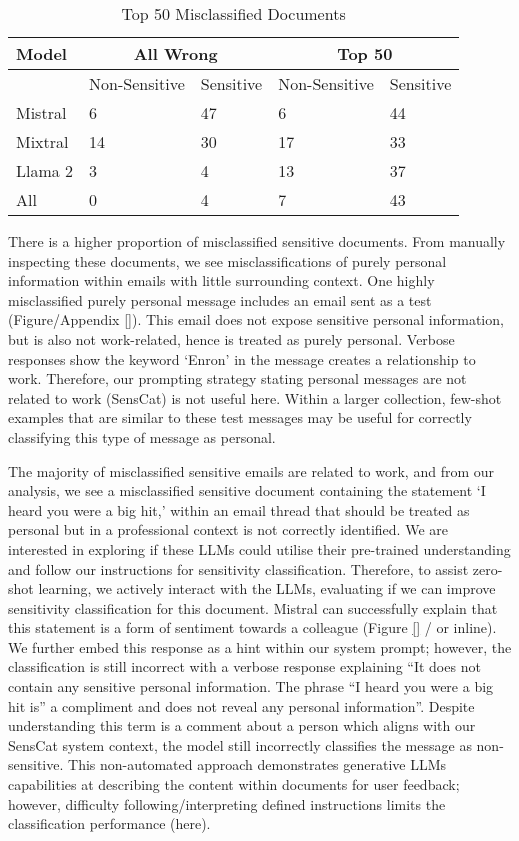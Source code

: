\begin{table}[]
\caption{Top 50 Misclassified Documents}
\label{table:misclassified}
\begin{tabular}{@{}lllll@{}}
\toprule
Model   & \multicolumn{2}{c}{All Wrong} & \multicolumn{2}{c}{Top 50} \\ \midrule
        & Non-Sensitive   & Sensitive   & Non-Sensitive  & Sensitive \\
Mistral & 6               & 47          & 6              & 44        \\
Mixtral & 14              & 30          & 17             & 33        \\
Llama 2 & 3               & 4           & 13             & 37        \\
All     & 0               & 4           & 7              & 43        \\ \bottomrule
\end{tabular}
\end{table}

There is a higher proportion of misclassified sensitive documents. From manually inspecting these documents, we see misclassifications of purely personal information within emails with little surrounding context. One highly misclassified purely personal message includes an email sent as a test (Figure/Appendix \ref{}). This email does not expose sensitive personal information, but is also not work-related, hence is treated as purely personal. Verbose responses show the keyword ‘Enron’ in the message creates a relationship to work. Therefore, our prompting strategy stating personal messages are not related to work (SensCat) is not useful here. Within a larger collection, few-shot examples that are similar to these test messages may be useful for correctly classifying this type of message as personal. 

The majority of misclassified sensitive emails are related to work, and from our analysis, we see a misclassified sensitive document containing the statement ‘I heard you were a big hit,’ within an email thread that should be treated as personal but in a professional context is not correctly identified. We are interested in exploring if these LLMs could utilise their pre-trained understanding and follow our instructions for sensitivity classification. Therefore, to assist zero-shot learning, we actively interact with the LLMs, evaluating if we can improve sensitivity classification for this document. Mistral can successfully explain that this statement is a form of sentiment towards a colleague (Figure \ref{} / or inline). We further embed this response as a hint within our system prompt; however, the classification is still incorrect with a verbose response explaining “It does not contain any sensitive personal information. The phrase “I heard you were a big hit is” a compliment and does not reveal any personal information”. Despite understanding this term is a comment about a person which aligns with our SensCat system context, the model still incorrectly classifies the message as non-sensitive. This non-automated approach demonstrates generative LLMs capabilities at describing the content within documents for user feedback; however, difficulty following/interpreting defined instructions limits the classification performance (here). 

